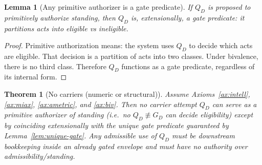 \documentclass[12pt]{article}
\newtheorem{lemma}{Lemma}
\newtheorem{theorem}{Theorem}
\begin{document}
\begin{lemma}[Any primitive authorizer is a gate predicate]
\label{lem:authorizer-is-gate}
If $Q_D$ is proposed to primitively authorize standing, then $Q_D$ is, extensionally, a gate predicate: it partitions acts into eligible vs ineligible.
\end{lemma}

\begin{proof}
Primitive authorization means: the system uses $Q_D$ to decide which acts are eligible. That decision is a partition of acts into two classes.
Under bivalence, there is no third class. Therefore $Q_D$ functions as a gate predicate, regardless of its internal form.
\end{proof}

\begin{theorem}[No carriers (numeric or structural)]
\label{thm:no-carriers}
Assume Axioms~\ref{ax:intell}, \ref{ax:miax}, \ref{ax:ametric}, and \ref{ax:biv}. Then no carrier attempt $Q_D$ can serve as a \emph{primitive} authorizer of standing (i.e.\ no $Q_D\not\equiv G_D$ can decide eligibility) except by coinciding extensionally with the unique gate predicate guaranteed by Lemma~\ref{lem:unique-gate}.
Any admissible use of $Q_D$ must be downstream bookkeeping inside an already gated envelope and must have no authority over admissibility/standing.
\end{theorem}
\end{document}

